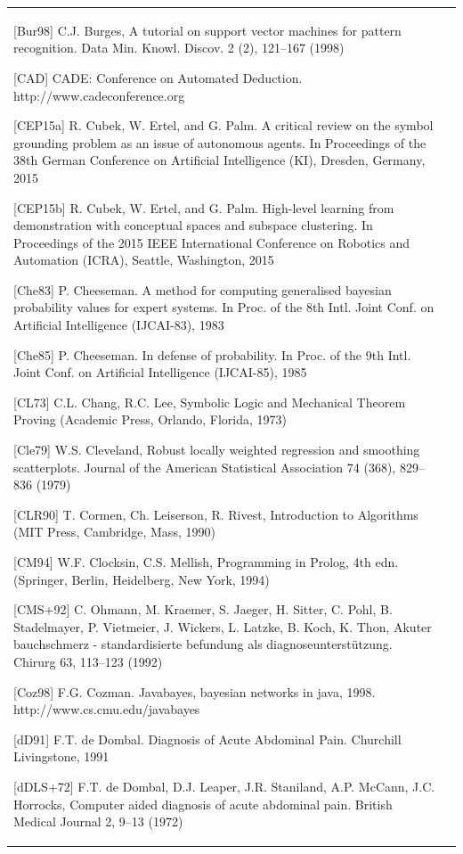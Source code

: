 \documentclass[10pt]{book}
\begin{document}
\begin{center}
\begin{tabular}{|l|l|}
[Bur98] C.J. Burges, A tutorial on support vector machines for pattern recognition. Data Min. Knowl. Discov. 2 (2), 121–167 (1998)

[CAD] CADE: Conference on Automated Deduction. http://www.cadeconference.org

[CEP15a] R. Cubek, W. Ertel, and G. Palm. A critical review on the symbol grounding problem as an issue of autonomous agents. In Proceedings of the 38th German Conference on Artificial Intelligence (KI), Dresden, Germany, 2015

[CEP15b] R. Cubek, W. Ertel, and G. Palm. High-level learning from demonstration with conceptual spaces and subspace clustering. In Proceedings of the 2015 IEEE International Conference on Robotics and Automation (ICRA), Seattle, Washington, 2015

[Che83] P. Cheeseman. A method for computing generalised bayesian probability values for expert systems. In Proc. of the 8th Intl. Joint Conf. on Artificial Intelligence (IJCAI-83), 1983

[Che85] P. Cheeseman. In defense of probability. In Proc. of the 9th Intl. Joint Conf. on Artificial Intelligence (IJCAI-85), 1985

[CL73] C.L. Chang, R.C. Lee, Symbolic Logic and Mechanical Theorem Proving (Academic Press, Orlando, Florida, 1973)

[Cle79] W.S. Cleveland, Robust locally weighted regression and smoothing scatterplots. Journal of the American Statistical Association 74 (368), 829–836 (1979)

[CLR90] T. Cormen, Ch. Leiserson, R. Rivest, Introduction to Algorithms (MIT Press, Cambridge, Mass, 1990)

[CM94] W.F. Clocksin, C.S. Mellish, Programming in Prolog, 4th edn. (Springer, Berlin, Heidelberg, New York, 1994)

[CMS+92] C. Ohmann, M. Kraemer, S. Jaeger, H. Sitter, C. Pohl, B. Stadelmayer, P. Vietmeier, J. Wickers, L. Latzke, B. Koch, K. Thon, Akuter bauchschmerz - standardisierte befundung als diagnoseunterstützung. Chirurg 63, 113–123 (1992)

[Coz98] F.G. Cozman. Javabayes, bayesian networks in java, 1998. http://www.cs.cmu.edu/javabayes

[dD91] F.T. de Dombal. Diagnosis of Acute Abdominal Pain. Churchill Livingstone, 1991

[dDLS+72] F.T. de Dombal, D.J. Leaper, J.R. Staniland, A.P. McCann, J.C. Horrocks, Computer aided diagnosis of acute abdominal pain. British Medical Journal 2, 9–13 (1972)


\end{tabular}
\end{center}
\end{document}
